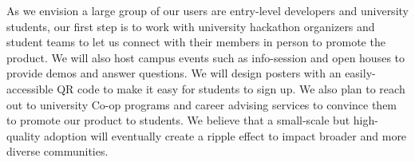\documentclass[12pt]{article}
\renewcommand{\_}{\kern-1.5pt\textunderscore\kern-1.5pt}
\begin{document}
As we envision a large group of our users are entry-level developers and university students, our first step is to work with university hackathon organizers and student teams to let us connect with their members in person to promote the product. We will also host campus events such as info-session and open houses to provide demos and answer questions. We will design posters with an easily-accessible QR code to make it easy for students to sign up. We also plan to reach out to university Co-op programs and career advising services to convince them to promote our product to students. We believe that a small-scale but high-quality adoption will eventually create a ripple effect to impact broader and more diverse communities. 

\newpage


\begingroup
\raggedright

{}

\nocite{*}

\endgroup

\newpage
\end{document}
